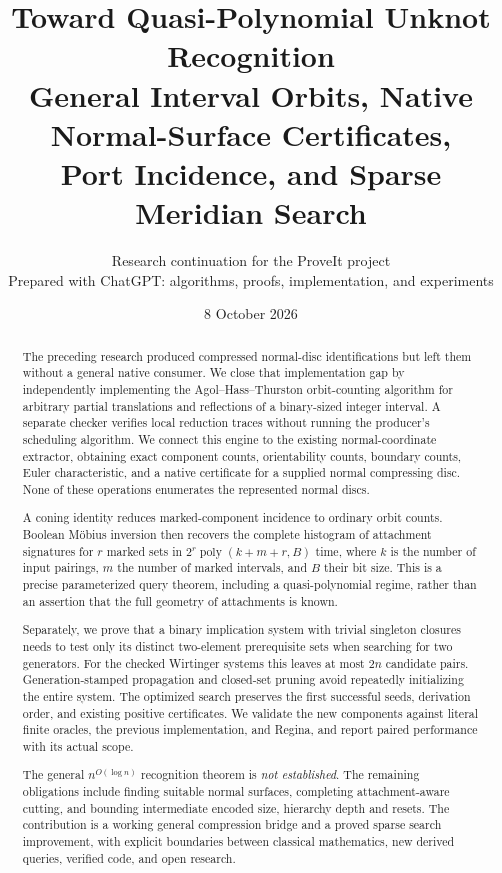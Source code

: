 \documentclass[11pt,a4paper]{article}
\title{\color{ink}Toward Quasi-Polynomial Unknot Recognition\\[5pt]
  \Large General Interval Orbits, Native Normal-Surface Certificates,\\
  Port Incidence, and Sparse Meridian Search}
\author{Research continuation for the ProveIt project\\
  \small Prepared with ChatGPT: algorithms, proofs, implementation, and experiments}
\date{8 October 2026}
\theoremstyle{definition}\newtheorem{definition}[theorem]{Definition}
\theoremstyle{remark}\newtheorem{remark}[theorem]{Remark}
\newcommand{\poly}{\operatorname{poly}}
\newcommand{\qp}{n^{O(\log n)}}
\begin{document}
\maketitle
\begin{abstract}
The preceding research produced compressed normal-disc identifications but
left them without a general native consumer. We close that implementation gap
by independently implementing the Agol--Hass--Thurston orbit-counting
algorithm for arbitrary partial translations and reflections of a binary-sized
integer interval. A separate checker verifies local reduction traces without
running the producer's scheduling algorithm. We connect this engine to the
existing normal-coordinate extractor, obtaining exact component counts,
orientability counts, boundary counts, Euler characteristic, and a native
certificate for a supplied normal compressing disc. None of these operations
enumerates the represented normal discs.

A coning identity reduces marked-component incidence to ordinary orbit counts.
Boolean M\"obius inversion then recovers the complete histogram of attachment
signatures for $r$ marked sets in $2^r\poly(k+m+r,B)$ time, where $k$ is the number
of input pairings, $m$ the number of marked intervals, and $B$ their bit size.
This is a precise parameterized query theorem, including a quasi-polynomial
regime, rather than an assertion that the full geometry of attachments is known.

Separately, we prove that a binary implication system with trivial singleton
closures needs to test only its distinct two-element prerequisite sets when
searching for two generators. For the checked Wirtinger systems this leaves at
most $2n$ candidate pairs. Generation-stamped propagation and closed-set
pruning avoid repeatedly initializing the entire system. The optimized search
preserves the first successful seeds, derivation order, and existing positive
certificates. We validate the new components against literal finite oracles,
the previous implementation, and Regina, and report paired performance with
its actual scope.

The general $\qp$ recognition theorem is \emph{not established}. The remaining
obligations include finding suitable normal surfaces, completing attachment-aware
cutting, and bounding intermediate encoded size, hierarchy depth and resets.
The contribution is a working general compression bridge and a proved sparse
search improvement, with explicit boundaries between classical mathematics,
new derived queries, verified code, and open research.
\end{abstract}
\clearpage
\setcounter{tocdepth}{1}
\tableofcontents
\clearpage
\end{document}
